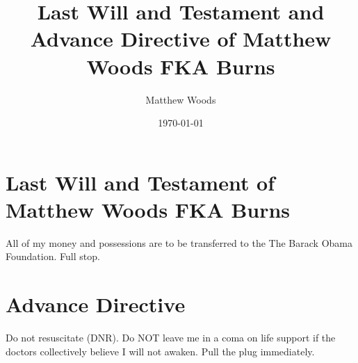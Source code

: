 \documentclass{article}
\title{Last Will and Testament and Advance Directive of Matthew Woods FKA Burns}
\author{Matthew Woods}
\date{\today}
\begin{document}
\maketitle

\section{Last Will and Testament of Matthew Woods FKA Burns}
All of my money and possessions are to be transferred to the The Barack Obama Foundation. Full stop. 

\section{Advance Directive}
Do not resuscitate (DNR). Do NOT leave me in a coma on life support if the doctors collectively believe I will not awaken. Pull the plug immediately. 
\end{document}
